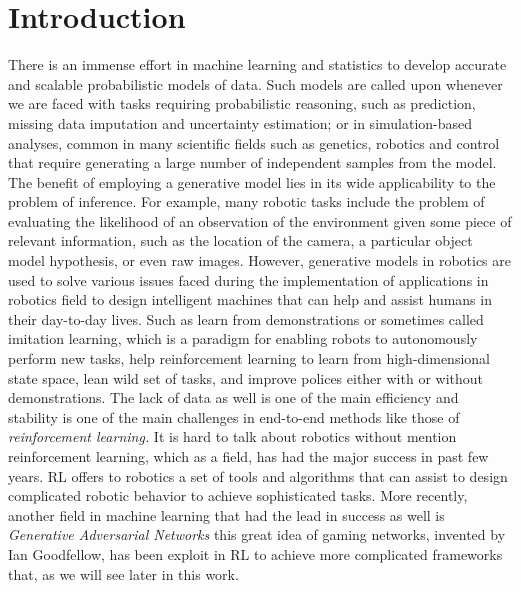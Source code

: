 
\pagestyle{fancy}  
\chapter*{Introduction}
\vspace{5 pt}
There is an immense effort in machine learning and statistics to develop accurate and scalable probabilistic models of data. Such models are called upon whenever we are faced with tasks requiring probabilistic reasoning, such as prediction, missing data imputation and uncertainty estimation; or in simulation-based analyses, common in many scientific fields such as genetics, robotics and control that require generating a large number of independent samples from the model. The benefit of employing a generative model lies in its wide applicability to the problem of inference. For example, many robotic tasks include the problem of evaluating the likelihood of an observation of the environment given some piece of relevant information, such as the location of the camera, a particular object model hypothesis, or even raw images. However, generative models in robotics are used to solve various issues faced during the implementation of applications in robotics field to design intelligent machines that can help and assist humans in their day-to-day lives. Such as learn from demonstrations or sometimes called imitation learning, which is a paradigm for enabling robots to autonomously perform new tasks, help reinforcement learning to learn from high-dimensional state space, lean wild set of tasks, and improve polices either with or without demonstrations. The lack of data as well is one of the main efficiency and stability is one of the main challenges in end-to-end methods like those of\textit{ \textacutedbl reinforcement learning\textgravedbl.} It is hard to talk about robotics without mention reinforcement learning, which as a field, has had the major success in past few years. RL offers to robotics a set of tools and algorithms that can assist to design complicated robotic behavior to achieve sophisticated tasks. More recently, another field in machine learning that had the lead in success as well is\textit{ \textacutedbl Generative Adversarial Networks\textgravedbl} this great idea of gaming networks, invented by Ian Goodfellow, has been exploit in RL to achieve more complicated frameworks that, as we will see later in this work.
